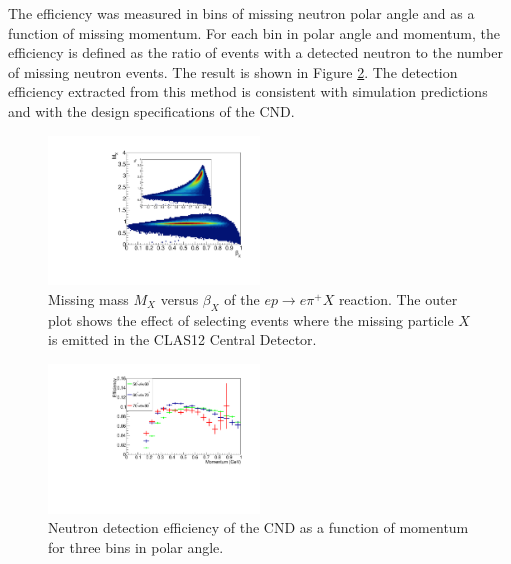 The efficiency was measured in bins of missing neutron polar angle and as a function of missing momentum. For each bin in polar angle and momentum, the efficiency is defined as the ratio of events with a detected neutron to the number of missing neutron events. The result is shown in Figure \ref{fig_performance_efficiency}. The detection efficiency extracted from this method is consistent with simulation predictions and with the design specifications of the CND.

\begin{figure}[htb]  
\begin{center}
\includegraphics[width=0.5\textwidth]{Figure/SelectionPlots.pdf}
\caption {Missing mass $M_X$ versus $\beta_X$ of the $e p \rightarrow e\pi^+X$ reaction. The outer plot shows the effect of selecting events where the missing particle $X$ is emitted in the CLAS12 Central Detector.}
\label{fig_performance_selection}
\end{center}
\end{figure}

\begin{figure}[htb]  
\begin{center}
\includegraphics[width=0.5\textwidth]{Figure/newEfficiency.pdf}
\caption {Neutron detection efficiency of the CND as a function of momentum for three bins in polar angle.}
\label{fig_performance_efficiency}
\end{center}
\end{figure}


